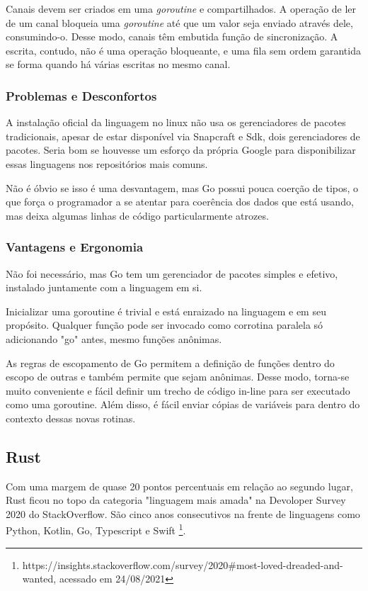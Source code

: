 \documentclass[12pt,a4paper]{article}
\begin{document}
Canais devem ser criados em uma \emph{goroutine} e compartilhados. A operação de ler de um canal bloqueia uma \emph{goroutine} até que um valor seja enviado através dele, consumindo-o. Desse modo, canais têm embutida função de sincronização. A escrita, contudo, não é uma operação bloqueante, e uma fila sem ordem garantida se forma quando há várias escritas no mesmo canal.

\subsubsection{Problemas e Desconfortos}
\label{sssec:go problemas}

A instalação oficial da linguagem no linux não usa os gerenciadores de pacotes tradicionais, apesar de estar disponível via Snapcraft e  Sdk, dois gerenciadores de pacotes. Seria bom se houvesse um esforço da própria Google para disponibilizar essas linguagens nos repositórios mais comuns.

Não é óbvio se isso é uma desvantagem, mas Go possui pouca coerção de tipos, o que força o programador a se atentar para coerência dos dados que está usando, mas deixa algumas linhas de código particularmente atrozes.

\subsubsection{Vantagens e Ergonomia}
\label{sssec:go vantagens}

Não foi necessário, mas Go tem um gerenciador de pacotes simples e efetivo, instalado juntamente com a linguagem em si.

Inicializar uma goroutine é trivial e está enraizado na linguagem e em seu propósito. Qualquer função pode ser invocado como corrotina paralela só adicionando "go" antes, mesmo funções anônimas.

As regras de escopamento de Go permitem a definição de funções dentro do escopo de outras e também permite que sejam anônimas. Desse modo, torna-se muito conveniente e fácil definir um trecho de código in-line para ser executado como uma goroutine. Além disso, é fácil enviar cópias de variáveis para dentro do contexto dessas novas rotinas.


\subsection{Rust}
\label{ssec:rust}

Com uma margem de quase 20 pontos percentuais em relação ao segundo lugar, Rust ficou no topo da categoria "linguagem mais amada" na Devoloper Survey 2020 do StackOverflow. São cinco anos consecutivos na frente de linguagens como Python, Kotlin, Go, Typescript e Swift \footnote{https://insights.stackoverflow.com/survey/2020\#most-loved-dreaded-and-wanted, acessado em 24/08/2021}.
\end{document}
